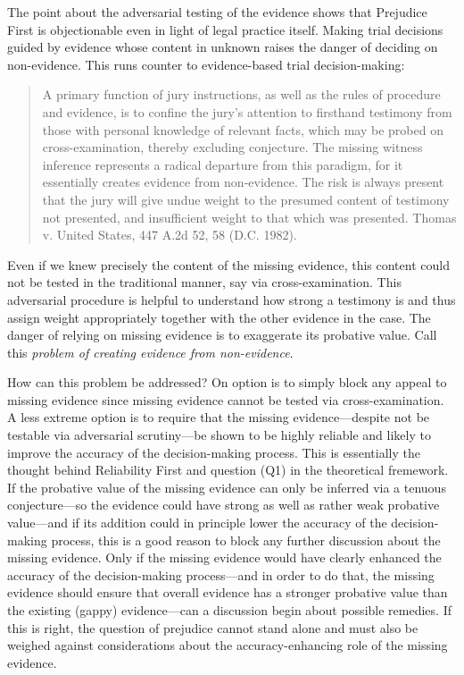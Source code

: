 \documentclass[
  10pt,
  dvipsnames,enabledeprecatedfontcommands]{scrartcl}
\begin{document}
The point about the adversarial testing of the evidence shows that
Prejudice First is objectionable even in light of legal practice itself.
Making trial decisions guided by evidence whose content in unknown
raises the danger of deciding on non-evidence. This runs counter to
evidence-based trial decision-making:

\begin{quote}
A primary function of jury instructions, as well as the rules of
procedure and evidence, is to confine the jury's attention to firsthand
testimony from those with personal knowledge of relevant facts, which
may be probed on cross-examination, thereby excluding conjecture. The
missing witness inference represents a radical departure from this
paradigm, for it essentially creates evidence from non-evidence. The
risk is always present that the jury will give undue weight to the
presumed content of testimony not presented, and insufficient weight to
that which was presented. Thomas v. United States, 447 A.2d 52, 58 (D.C.
1982).
\end{quote}

\noindent Even if we knew precisely the content of the missing evidence,
this content could not be tested in the traditional manner, say via
cross-examination. This adversarial procedure is helpful to understand
how strong a testimony is and thus assign weight appropriately together
with the other evidence in the case. The danger of relying on missing
evidence is to exaggerate its probative value. Call this \emph{problem
of creating evidence from non-evidence}.

How can this problem be addressed? On option is to simply block any
appeal to missing evidence since missing evidence cannot be tested via
cross-examination. A less extreme option is to require that the missing
evidence---despite not be testable via adversarial scrutiny---be shown
to be highly reliable and likely to improve the accuracy of the
decision-making process. This is essentially the thought behind
Reliability First and question (Q1) in the theoretical fremework. If the
probative value of the missing evidence can only be inferred via a
tenuous conjecture---so the evidence could have strong as well as rather
weak probative value---and if its addition could in principle lower the
accuracy of the decision-making process, this is a good reason to block
any further discussion about the missing evidence. Only if the missing
evidence would have clearly enhanced the accuracy of the decision-making
process---and in order to do that, the missing evidence should ensure
that overall evidence has a stronger probative value than the existing
(gappy) evidence---can a discussion begin about possible remedies. If
this is right, the question of prejudice cannot stand alone and must
also be weighed against considerations about the accuracy-enhancing role
of the missing evidence.
\end{document}

